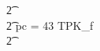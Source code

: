 \begin{figure}[t!]
\begin{circus}
    \t2 {} \cdots {} \\
    \t2 {} \circelse pc = 43 \circthen TPK\_f \\
    \t2 {} \cdots {} \\

\end{circus}
\end{figure}
